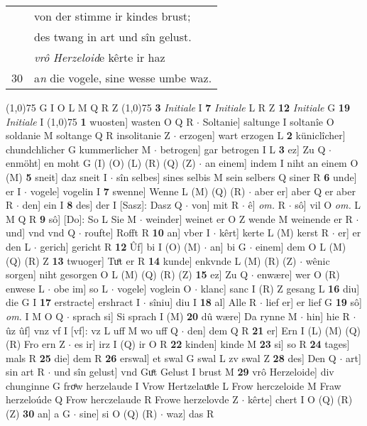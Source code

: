 \documentclass[8pt,a4paper,notitlepage]{article}
\begin{document}
\begin{table}[ht]
\begin{minipage}[t]{0.5\linewidth}
\begin{tabular}{rl}
 & von der stimme ir kindes brust;\\ 
 & des twang in art und sîn gelust.\\ 
 & \textit{vrô} \textit{Herzeloid}e kêrte ir haz\\ 
30 & a\textit{n} die vogele, sine wesse umbe waz.\\ 
\end{tabular}
\scriptsize
\line(1,0){75} \newline
G I O L M Q R Z \newline
\line(1,0){75} \newline
\textbf{3} \textit{Initiale} I  \textbf{7} \textit{Initiale} L R Z  \textbf{12} \textit{Initiale} G  \textbf{19} \textit{Initiale} I  \newline
\line(1,0){75} \newline
\textbf{1} wuosten] wasten O Q R  $\cdot$ Soltanie] saltunge I soltanîe O soldanie M soltange Q R insolitanie Z  $\cdot$ erzogen] wart erzogen L \textbf{2} küniclîcher] chundchlicher G kummerlicher M  $\cdot$ betrogen] gar betrogen I L \textbf{3} ez] Zu Q  $\cdot$ enmöht] en moht G (I) (O) (L) (R) (Q) (Z)  $\cdot$ an einem] indem I niht an einem O (M) \textbf{5} sneit] daz sneit I  $\cdot$ sîn selbes] sines selbis M sein selbers Q siner R \textbf{6} unde] er I  $\cdot$ vogele] vogelin I \textbf{7} swenne] Wenne L (M) (Q) (R)  $\cdot$ aber er] aber Q er aber R  $\cdot$ den] ein I \textbf{8} des] der I [Sasz]: Dasz Q  $\cdot$ von] mit R  $\cdot$ ê] \textit{om.} R  $\cdot$ sô] vil O \textit{om.} L M Q R \textbf{9} sô] [Do]: So L Sie M  $\cdot$ weinder] weinet er O Z wende M weinende er R  $\cdot$ und] vnd vnd Q  $\cdot$ roufte] Rofft R \textbf{10} an] vber I  $\cdot$ kêrt] kerte L (M) kerst R  $\cdot$ er] er den L  $\cdot$ gerich] gericht R \textbf{12} Ûf] bi I (O) (M)  $\cdot$ an] bi G  $\cdot$ einem] dem O L (M) (Q) (R) Z \textbf{13} twuoger] Tuͦt er R \textbf{14} kunde] enkvnde L (M) (R) (Z)  $\cdot$ wênic sorgen] niht gesorgen O L (M) (Q) (R) (Z) \textbf{15} ez] Zu Q  $\cdot$ enwære] wer O (R) enwese L  $\cdot$ obe im] so L  $\cdot$ vogele] voglein O  $\cdot$ klanc] sanc I (R) Z gesang L \textbf{16} diu] die G I \textbf{17} erstracte] ershract I  $\cdot$ sîniu] diu I \textbf{18} al] Alle R  $\cdot$ lief er] er lief G \textbf{19} sô] \textit{om.} I M O Q  $\cdot$ sprach si] Si sprach I (M) \textbf{20} dû wære] Da rynne M  $\cdot$ hin] hie R  $\cdot$ ûz ûf] vnz vf I [vf]: vz L uff M wo uff Q  $\cdot$ den] dem Q R \textbf{21} er] Ern I (L) (M) (Q) (R) Fro ern Z  $\cdot$ es ir] irz I (Q) ir O R \textbf{22} kinden] kinde M \textbf{23} si] so R \textbf{24} tages] mals R \textbf{25} die] dem R \textbf{26} erswal] et swal G swal L zv swal Z \textbf{28} des] Den Q  $\cdot$ art] sin art R  $\cdot$ und sîn gelust] vnd Guͤt Gelust I brust M \textbf{29} vrô Herzeloide] div chunginne G froͤw herzelaude I Vrow Hertzelauͯde L Frow herczeloide M Fraw herzeloúde Q Frow herczelaude R Frowe herzelovde Z  $\cdot$ kêrte] chert I O (Q) (R) (Z) \textbf{30} an] a G  $\cdot$ sine] si O (Q) (R)  $\cdot$ waz] das R \newline

\end{minipage}
\end{table}
\end{document}
